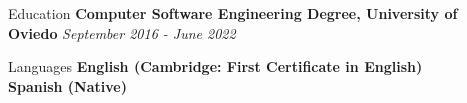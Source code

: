 \documentclass{resume} %
\begin{document}




\pagestyle{fancy}

\def\headrulewidth{0pt}
\setlength{\ruleheight}{\textheight}
\addtolength{\ruleheight}{20mm}
\fancyhead{}
\fancyfoot{}
\fancyfoot[C]{\footnotesize\thepage}





\begin{rSection}{Education}
{\bf Computer Software Engineering Degree, University of Oviedo} \hfill {\em September 2016 - June 2022} \\ 
\end{rSection}


\begin{rSection}{Languages}
{\bf English (Cambridge: First Certificate in English)} \hfill \\
{\bf Spanish (Native)} \\
\end{rSection}

\end{document}
